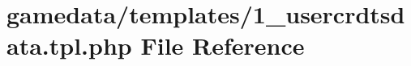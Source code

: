 \hypertarget{1__usercrdtsdata_8tpl_8php}{\section{gamedata/templates/1\+\_\+usercrdtsdata.tpl.\+php File Reference}
\label{1__usercrdtsdata_8tpl_8php}
}
